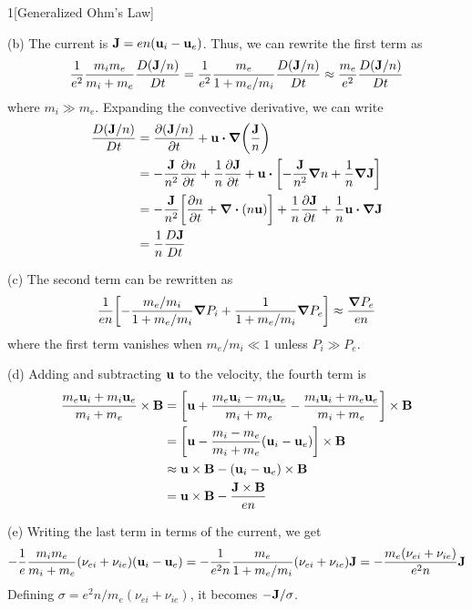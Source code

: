 \documentclass[12pt]{article}
\begin{document}
\begin{problem}{1}[Generalized Ohm's Law]
\begin{solution}
(b) The current is $\vb{J}=en(\vb{u}_i-\vb{u}_e)$. Thus, we can rewrite the
first term as
\begin{equation}
    \frac1{e^2}\frac{m_im_e}{m_i+m_e}\frac{D(\vb{J}/n)}{Dt}
    =\frac{1}{e^2}\frac{m_e}{1+m_e/m_i}\frac{D(\vb{J}/n)}{Dt}
    \approx\frac{m_e}{e^2}\frac{D(\vb{J}/n)}{Dt}
\end{equation}
where $m_i\gg m_e$. Expanding the convective derivative, we can write
\begin{align}
    \frac{D(\vb{J}/n)}{Dt}
    &=\frac{\partial(\vb{J}/n)}{\partial
    t}+\vb{u}\vdot\grad\qty(\frac{\vb{J}}{n})\notag\\
    &=-\frac{\vb{J}}{n^2}\frac{\partial n}{\partial
    t}+\frac1n\frac{\partial\vb{J}}{\partial t}
+\vb{u}\vdot\qty[-\frac{\vb{J}}{n^2}\grad n+\frac1n\grad\vb{J}]\notag\\
    &=-\frac{\vb{J}}{n^2}\qty[\frac{\partial n}{\partial t}+\div{\qty(n\vb{u})}]
    +\frac1n\frac{\partial\vb{J}}{\partial t}
    +\frac1n\vb{u}\vdot\grad\vb{J}\notag\\
    &=\frac1n\frac{D\vb{J}}{Dt}
\end{align}

(c) The second term can be rewritten as
\begin{equation}
    \frac{1}{en}\qty[-\frac{m_e/m_i}{1+m_e/m_i}\grad
        P_i+\frac1{1+m_e/m_i}\grad P_e] 
    \approx\frac{\grad P_e}{en}
\end{equation}
where the first term vanishes when $m_e /m_i\ll 1$ unless $P_i\gg P_e$.

(d) Adding and subtracting $\vb{u}$ to the velocity, the fourth term is
\begin{align}
    \frac{m_e\vb{u}_i+m_i\vb{u}_e}{m_i+m_e}\times\vb{B}
    &=\qty[\vb{u}+\frac{m_e\vb{u}_i-m_i\vb{u}_e}{m_i+m_e}-\frac{m_i\vb{u}_i+m_e\vb{u}_e}{m_i+m_e}]\times\vb{B}\notag\\
    &=\qty[\vb{u}-\frac{m_i-m_e}{m_i+m_e}\qty(\vb{u}_i-\vb{u}_e)]\times\vb{B}
    \notag\\
    &\approx\vb{u}\times\vb{B}-\qty(\vb{u}_i-\vb{u}_e)\times\vb{B}\notag\\
    &=\vb{u}\times\vb{B}-\frac{\vb{J}\times\vb{B}}{en}
\end{align}

(e) Writing the last term in terms of the current, we get
\begin{align}
    -\frac1e\frac{m_im_e}{m_i+m_e}\qty(\nu_{ei}+\nu_{ie})\qty(\vb{u}_i-\vb{u}_e)
    =-\frac1{e^2n}\frac{m_e}{1+m_e/m_i}\qty(\nu_{ei}+\nu_{ie})\vb{J}
    =-\frac{m_e(\nu_{ei}+\nu_{ie})}{e^2n}\vb{J}
\end{align}
Defining $\sigma=e^2n /m_e(\nu_{ei}+\nu_{ie})$, it becomes $-\vb{J} /\sigma$.


\end{solution}
\end{problem}
\end{document}
